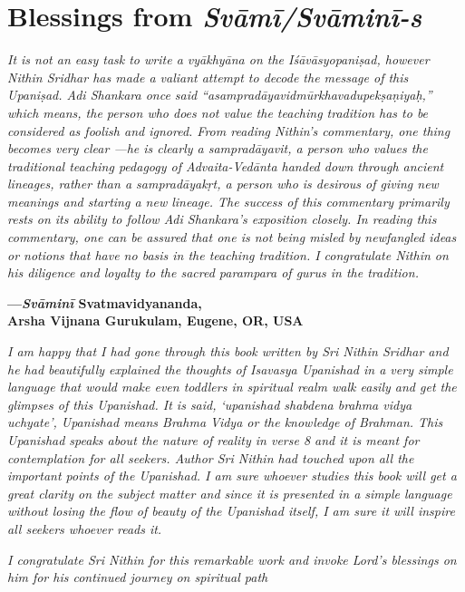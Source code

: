 \chapter{Blessings from \emph{Svāmī/Svāminī-s}}

\emph{It is not an easy task to write a vyākhyāna on the Iśāvāsyopaniṣad, however Nithin Sridhar has made a valiant attempt to decode the message of this Upaniṣad. Adi Shankara once said ``asampradāyavidmūrkhavadupekṣaṇiyaḥ,'' which means, the person who does not value the teaching tradition has to be considered as foolish and ignored. From reading Nithin's commentary, one thing becomes very clear ---he is clearly a sampradāyavit, a person who values the traditional teaching pedagogy of Advaita-Vedānta handed down through ancient lineages, rather than a sampradāyakṛt, a person who is desirous of giving new meanings and starting a new lineage. The success of this commentary primarily rests on its ability to follow Adi Shankara's exposition closely. In reading this commentary, one can be assured that one is not being misled by newfangled ideas or notions that have no basis in the teaching tradition. I congratulate Nithin on his diligence and loyalty to the sacred parampara of gurus in the tradition.}
\medskip

\begin{flushright}
\textbf{---\emph{Svāminī} Svatmavidyananda,}\\
\textbf{Arsha Vijnana Gurukulam, Eugene, OR, USA}
\end{flushright}
\medskip

\emph{I am happy that I had gone through this book written by Sri Nithin Sridhar and he had beautifully explained the thoughts of Isavasya Upanishad in a very simple language that would make even toddlers in spiritual realm walk easily and get the glimpses of this Upanishad. It is said, `upanishad shabdena brahma vidya uchyate', Upanishad means Brahma Vidya or the knowledge of Brahman. This Upanishad speaks about the nature of reality in verse 8 and it is meant for contemplation for all seekers. Author Sri Nithin had touched upon all the important points of the Upanishad. I am sure whoever studies this book will get a great clarity on the subject matter and since it is presented in a simple language without losing the flow of beauty of the Upanishad itself, I am sure it will inspire all seekers whoever reads it.}

\emph{I congratulate Sri Nithin for this remarkable work and invoke Lord's blessings on him for his continued journey on spiritual path}
\medskip

